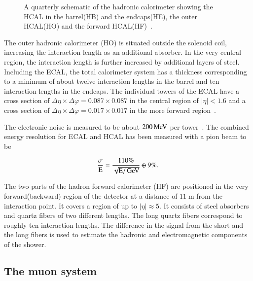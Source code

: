 \begin{figure}[htbp!]
  \begin{center}

\caption{A quarterly schematic of the hadronic calorimeter showing the HCAL in the barrel(HB) and the endcaps(HE), the outer HCAL(HO) and the forward HCAL(HF)~\cite{2010JInst...5T3014C}.
  \label{fig:det_HCAL}}
  \end{center}
\end{figure}



The outer hadronic calorimeter (HO) is situated outside the solenoid coil, increasing the interaction length as an additional absorber.
In the very central region, the interaction length is further increased by additional layers of steel.
Including the ECAL, the total calorimeter system has a thickness corresponding to a minimum of about twelve interaction lengths in the barrel and ten interaction lengths in the endcaps.
The individual towers of the ECAL have a cross section of $\Delta \eta \times \Delta \varphi = 0.087 \times 0.087$ in the central region of $|\eta|< 1.6$ and a cross section of $\Delta \eta \times \Delta \varphi = 0.017 \times 0.017$
in the more forward region~\cite{Bayatian:922757}.

The electronic noise is measured to be about $200 \,\text{Me\hspace{-.08em}V}$ per tower~\cite{Sirunyan:2017ulk}.
The combined energy resolution for ECAL and HCAL has been measured with a pion beam to be 

\begin{equation}
\frac{\sigma}{\mathrm{E}} = \frac{110\%}{\sqrt{\mathrm{E}/\,\text{Ge\hspace{-.08em}V}}} \oplus 9\%.
\end{equation}

The two parts of the hadron forward calorimeter (HF) are positioned in the very forward(backward) region of the detector at a distance of $11\;\si{\meter}$ from the interaction point.
It covers a region of up to $|\eta| \approx 5$. It consists of steel absorbers and quartz fibers of two different lengths. The long quartz fibers correspond to roughly ten interaction lengths. The difference in the signal from the short and the long fibers is used to estimate the hadronic and electromagnetic components of the shower.

\subsection{The muon system}

